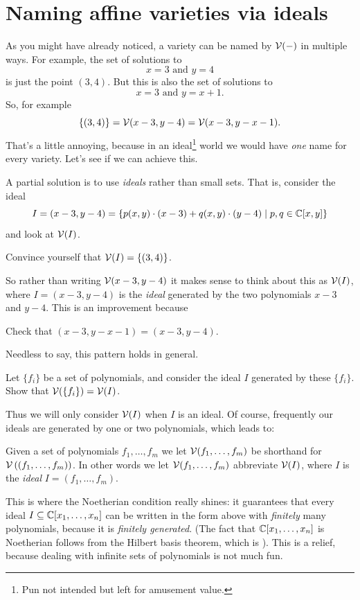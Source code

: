 \section{Naming affine varieties via ideals}
As you might have already noticed, a variety can be named by $\mathcal V(-)$ in multiple ways.
For example, the set of solutions to
\[ x=3 \text{ and } y=4 \]
is just the point $(3,4)$.
But this is also the set of solutions to
\[ x=3 \text{ and } y=x+1. \]
So, for example
\[ \{(3,4)\}
	= \mathcal V(x-3, y-4)
	= \mathcal V(x-3, y-x-1).
	\]
That's a little annoying, because in an ideal\footnote{Pun not intended
	but left for amusement value.}
world we would have \emph{one} name
for every variety.
Let's see if we can achieve this.

A partial solution is to use \emph{ideals} rather than small sets.
That is, consider the ideal
\[
	I = \left( x-3, y-4 \right)
	= \left\{ p(x,y) \cdot (x-3) + q(x,y) \cdot (y-4)
	\mid p,q \in \mathbb C[x,y] \right\}
\]
and look at $\mathcal V(I)$.
\begin{ques}
	Convince yourself that $\mathcal V(I) = \{(3,4)\}$.
\end{ques}
So rather than writing $\mathcal V(x-3, y-4)$ it makes sense to
think about this as $\mathcal V( I )$, where $I = (x-3,y-4)$ is the \emph{ideal}
generated by the two polynomials $x-3$ and $y-4$.
This is an improvement because
\begin{ques}
	Check that $(x-3, y-x-1) = (x-3, y-4)$.
\end{ques}

Needless to say, this pattern holds in general.
\begin{ques}
	Let $\{f_i\}$ be a set of polynomials, and consider
	the ideal $I$ generated by these $\{f_i\}$.
	Show that $\mathcal V(\{f_i\}) = \mathcal V(I)$.
\end{ques}

Thus we will only consider $\mathcal V(I)$ when $I$ is an ideal.
Of course, frequently our ideals are generated by one or two polynomials,
which leads to:
\begin{abuse}
	Given a set of polynomials $f_1, \dots, f_m$
	we let $\mathcal V(f_1, \dots, f_m)$ be shorthand for
	$\mathcal V\left( \left( f_1, \dots, f_m \right) \right)$.
	In other words we let $\mathcal V(f_1, \dots, f_m)$
	abbreviate $\mathcal V(I)$, where $I$ is the \emph{ideal} $I=(f_1, \dots, f_m)$.
\end{abuse}

This is where the Noetherian condition really shines:
it guarantees that every ideal $I \subseteq \mathbb C[x_1, \dots, x_n]$
can be written in the form above with \emph{finitely} many polynomials,
because it is \emph{finitely generated}.
(The fact that $\mathbb C[x_1, \dots, x_n]$ is Noetherian follows from the Hilbert basis theorem,
which is ).
This is a relief, because dealing with infinite sets of polynomials is not much fun.

